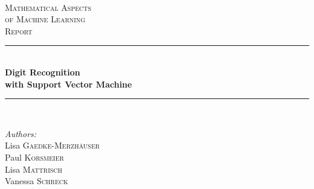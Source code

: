 \documentclass[12pt, a4paper, openany, bibliography=totoc]{report} %
\theoremstyle{definition}
\numberwithin{equation}{chapter}
\begin{document}
  \pagestyle{empty}
\begin{titlepage}
	
	\newcommand{\HRule}{\rule{\linewidth}{0.5mm}} %
	
	\center %
	
	\hspace*{5.0cm}\\[4cm]

	\textsc{\LARGE Mathematical Aspects\\[0.2cm] of Machine Learning}\\[0.5cm] %
	\textsc{\large Report}\\[2cm] %
	
	
	\HRule \\[0.8cm]
	{ \huge \bfseries Digit Recognition\\ with Support Vector Machine}\\[0.8cm] %
	\HRule \\[1.5cm]
	
	
	\begin{minipage}{0.4\textwidth}
		\begin{flushleft} \large
			\emph{Authors:}\\
			Lisa \textsc{Gaedke-Merzhäuser} \\%
			Paul \textsc{Korsmeier}\\
			Lisa \textsc{Mattrisch}\\
			Vanessa \textsc{Schreck}\\
		\end{flushleft}
	\end{minipage}
	~
	\begin{minipage}{0.4\textwidth}
		\begin{flushright} \large
			\emph{} \\
			 \textsc{} %
		\end{flushright}
	\end{minipage}\\[2cm]

	
	
\end{titlepage}
\end{document}
